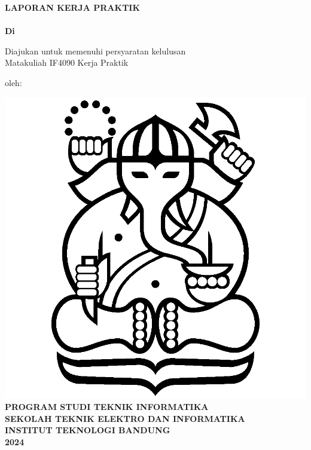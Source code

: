 \clearpage
\pagestyle{empty}

\begin{center}
    \vspace{-4.5cm} 
    \large\textbf{LAPORAN KERJA PRAKTIK\\
    \MakeUppercase{\thetitle}\\ Di \perusahaanKP}

    \vspace{40pt}
    Diajukan untuk memenuhi persyaratan kelulusan\\ Matakuliah IF4090 Kerja Praktik %
    \vspace{5em}

    oleh:\\
    \theauthor

    \vspace{25pt}

    \includegraphics[scale=0.1]{img/logo_itb_sampul.png}\\
    \vspace{15pt}
    \textbf{\MakeUppercase{Program Studi Teknik Informatika}\\
    \MakeUppercase{Sekolah Teknik Elektro dan Informatika}\\
    \MakeUppercase{Institut Teknologi Bandung}\\
    2024}

\end{center}

\clearpage